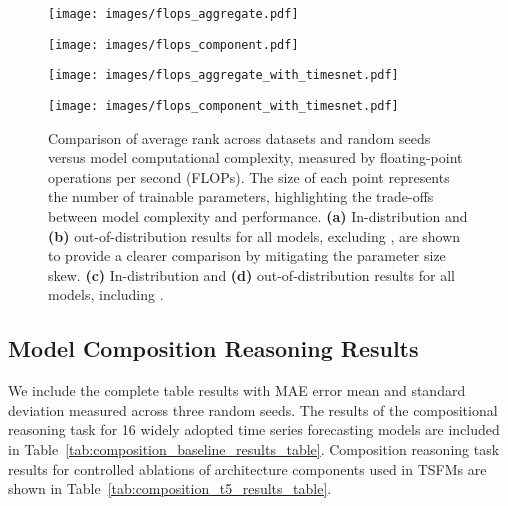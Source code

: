 \begin{figure*}[htbp]
    \centering

    \begin{minipage}{0.495\textwidth}
        \centering
        \texttt{[image: images/flops\_aggregate.pdf]}
        \label{fig:flops_aggregate}
    \end{minipage}%
    \hfill
    \begin{minipage}{0.495\textwidth}
        \centering
        \texttt{[image: images/flops\_component.pdf]}
        \label{fig:flops_component}
    \end{minipage}

    \vspace{1ex} %

    \begin{minipage}{0.495\textwidth}
        \centering
        \texttt{[image: images/flops\_aggregate\_with\_timesnet.pdf]}
        \label{fig:flops_aggregate_with_timesnet}
    \end{minipage}%
    \hfill
    \begin{minipage}{0.495\textwidth}
        \centering
        \texttt{[image: images/flops\_component\_with\_timesnet.pdf]}
        \label{fig:flops_component_with_timesnet}
    \end{minipage}

    \caption{Comparison of average rank across datasets and random seeds versus model computational complexity, measured by floating-point operations per second (FLOPs). The size of each point represents the number of trainable parameters, highlighting the trade-offs between model complexity and performance. \textbf{(a)} In-distribution and \textbf{(b)} out-of-distribution results for all models, excluding \TimesNet, are shown to provide a clearer comparison by mitigating the parameter size skew. \textbf{(c)} In-distribution and \textbf{(d)} out-of-distribution results for all models, including \TimesNet.}
    \label{fig:flops_model_comparison_apd}
\end{figure*}


\newpage
\subsection{Model Composition Reasoning Results}\label{apd:composition_full_table_results}
We include the complete table results with MAE error mean and standard deviation measured across three random seeds. The results of the compositional reasoning task for 16 widely adopted time series forecasting models are included in Table~\ref{tab:composition_baseline_results_table}. Composition reasoning task results for controlled ablations of architecture components used in TSFMs are shown in Table~\ref{tab:composition_t5_results_table}.



